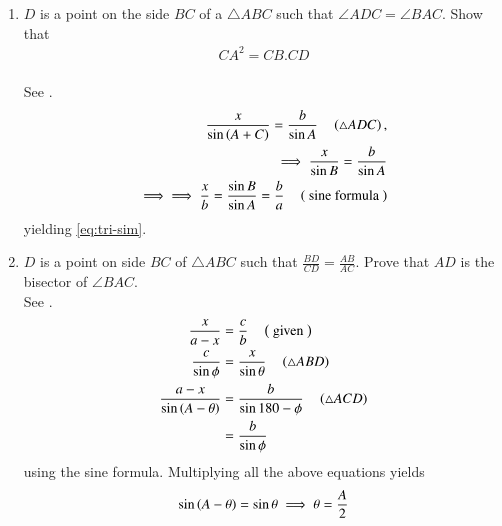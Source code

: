 \begin{enumerate}[label=\thesubsection.\arabic*.,ref=\thesubsection.\theenumi]

\item  $D$ is a point on the side $BC$ of a $\triangle ABC$ such that  $\angle  ADC =  \angle  BAC$. Show that 
\begin{align}
	\label{eq:tri-sim}	
	CA^2 = CB.CD
\end{align}
%
	\\
		\solution
	See .	
\begin{align}
	\frac{x}{\sin\left(A+C\right)} = 
	\frac{b}{\sin A}  
\quad 
		\left(\triangle ADC\right),
		\\
\implies	\frac{x}{\sin B} = 
	\frac{b}{\sin A}  
	\\
	\implies 
\implies	\frac{x}{b} = 
	\frac{\sin B}{\sin A}  = 
	\frac{b}{a}  \quad \left(\text{ sine formula }\right)
\end{align}
yielding
	\eqref{eq:tri-sim}.	
\begin{figure}[H]
	\begin{center}
			\resizebox{0.6\columnwidth}{!}{}
	\end{center}
	\caption{}
	\label{fig:tri-sim}	
\end{figure}
\item   $D$ is a point on side $BC$ of  $\triangle  ABC$ such that
$\frac{BD}{CD}= \frac{AB}{AC}  $.  Prove that $AD$ is the bisector of  $\angle  BAC$.
\\
\solution 
	See .	
\begin{align}
	\frac{x}{a-x} &= 
	\frac{c}{b}  \quad \left(\text{ given }\right)
	\\
	\frac{c}{\sin\phi} &= 
	\frac{x}{\sin \theta}  \quad \left(\triangle ABD\right)
	\\
	\frac{a-x}{\sin\left(A-\theta\right)} &= 
	\frac{b}{\sin 180-\phi}  \quad \left(\triangle ACD\right)
	\\
	&=\frac{b}{\sin \phi}
\end{align}
using the sine formula.  Multiplying all the above equations yields
\begin{align}
	\sin \left(A-\theta\right)
	=\sin \theta \implies \theta = \frac{A}{2}
\end{align}
\begin{figure}[H]
	\begin{center}
			\resizebox{0.6\columnwidth}{!}{}
	\end{center}
	\caption{}
	\label{fig:tri-ang-bis}	

\end{figure}
\end{enumerate}
